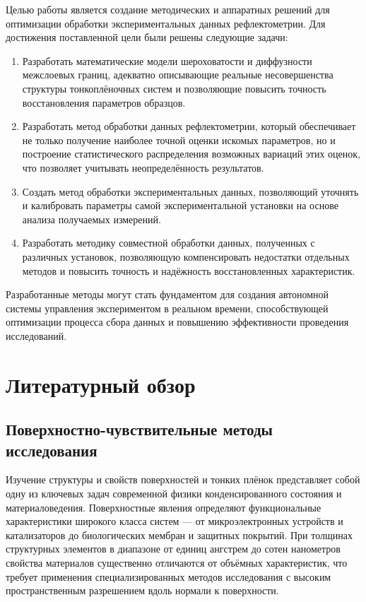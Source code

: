 \documentclass[a4paper]{article}
\begin{document}
Целью работы является создание методических и аппаратных решений для оптимизации обработки экспериментальных данных рефлектометрии. Для достижения поставленной цели были решены следующие задачи:
\begin{enumerate}
\item Разработать математические модели шероховатости и диффузности межслоевых границ, адекватно описывающие реальные несовершенства структуры тонкоплёночных систем и позволяющие повысить точность восстановления параметров образцов.
\item Разработать метод обработки данных рефлектометрии, который обеспечивает не только получение наиболее точной оценки искомых параметров, но и построение статистического распределения возможных вариаций этих оценок, что позволяет учитывать неопределённость результатов.
\item Создать метод обработки экспериментальных данных, позволяющий уточнять и калибровать параметры самой экспериментальной установки на основе анализа получаемых измерений.
\item Разработать методику совместной обработки данных, полученных с различных установок, позволяющую компенсировать недостатки отдельных методов и повысить точность и надёжность восстановленных характеристик.
\end{enumerate}
Разработанные методы могут стать фундаментом для создания автономной системы управления экспериментом в реальном времени, способствующей оптимизации процесса сбора данных и повышению эффективности проведения исследований.

\section{Литературный обзор}
\subsection{Поверхностно-чувствительные методы исследования}

Изучение структуры и свойств поверхностей и тонких плёнок представляет собой одну из ключевых задач современной физики конденсированного состояния и материаловедения. Поверхностные явления определяют функциональные характеристики широкого класса систем — от микроэлектронных устройств и катализаторов до биологических мембран и защитных покрытий. При толщинах структурных элементов в диапазоне от единиц ангстрем до сотен нанометров свойства материалов существенно отличаются от объёмных характеристик, что требует применения специализированных методов исследования с высоким пространственным разрешением вдоль нормали к поверхности.
\end{document}
